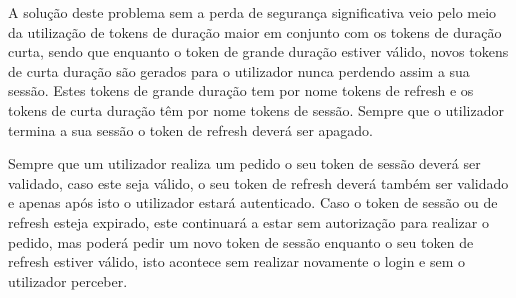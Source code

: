 A solução deste problema sem a perda de segurança significativa veio pelo meio da utilização de tokens de duração maior em conjunto 
com os tokens de duração curta, sendo que enquanto o token de grande duração estiver válido, novos tokens de curta duração são gerados 
para o utilizador nunca perdendo assim a sua sessão. Estes tokens de grande duração tem por nome tokens de refresh e os tokens de curta 
duração têm por nome tokens de sessão. Sempre que o utilizador termina a sua sessão o token de refresh deverá ser apagado.

Sempre que um utilizador realiza um pedido o seu token de sessão deverá ser validado, caso este seja válido, o seu token de refresh deverá 
também ser validado e apenas após isto o utilizador estará autenticado. Caso o token de sessão ou de refresh esteja expirado, este continuará
a estar sem autorização para realizar o pedido, mas poderá pedir um novo token de sessão enquanto o seu token de refresh estiver válido, 
isto acontece sem realizar novamente o login e sem o utilizador perceber.